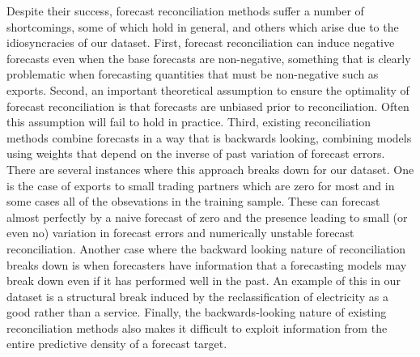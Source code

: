 \documentclass[a4paper,fleqn,11pt]{article}
\begin{document}
Despite their success, forecast reconciliation methods suffer a number of shortcomings, some of which hold in general, and others which arise due to the idiosyncracies of our dataset.  First, forecast reconciliation can induce negative forecasts even when the base forecasts are non-negative, something that is clearly problematic when forecasting quantities that must be non-negative such as exports.   Second, an important theoretical assumption to ensure the optimality of forecast reconciliation is that forecasts are unbiased prior to reconciliation.  Often this assumption will fail to hold in practice.  Third, existing reconciliation methods combine forecasts in a way that is backwards looking, combining models using weights that depend on the inverse of past variation of forecast errors.  There are several instances where this approach breaks down for our dataset.  One is the case of exports to small trading partners which are zero for most and in some cases all of the obsevations in the training sample.  These can forecast almost perfectly by a naive forecast of zero and the presence leading to small (or even no) variation in forecast errors and numerically unstable forecast reconciliation.  Another case where the backward looking nature of reconciliation breaks down is when forecasters have information that a forecasting models may break down even if it has performed well in the past. An example of this in our dataset is a structural break induced by the reclassification of electricity as a good rather than a service.  Finally, the backwards-looking nature of existing reconciliation methods also makes it difficult to exploit information from the entire predictive density of a forecast target.\\
\end{document}
